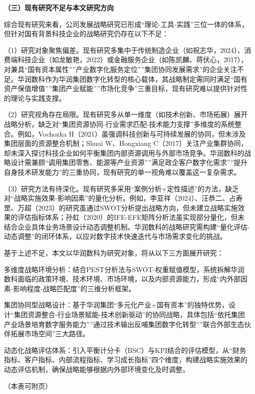\documentclass[UTF8, a4paper, 11pt]{ctexart}
\begin{document}
\begin{UnifiedBox}
\vspace{0.3cm}
\noindent \textbf{（三）现有研究不足与本文研究方向}

\vspace{0.2cm}
综合现有研究来看，公司发展战略研究已形成``理论-工具-实践''三位一体的体系，但针对国有背景科技企业的战略研究仍存在以下不足：

（1）研究对象聚焦偏差。现有研究多集中于传统制造企业（如祝志华，2024）、消费端科技企业（如龙敏艳，2022）或金融服务企业（如陈凯麟、蒋伏心，2017），对兼具``国有资本属性''''产业数字化服务定位''''集团协同发展需求''的企业关注不足。华润数科作为华润集团数字化转型的核心载体，其战略制定需同时满足``国有资产保值增值''''集团产业赋能''''市场化竞争''三重目标，现有研究难以提供针对性的理论与实践支撑。

（2）研究视角存在局限。现有研究多从单一维度（如技术创新、市场拓展）展开战略分析，缺乏对``集团资源协同-行业需求匹配-技术能力支撑''多维度的系统整合。例如，Vochozka H（2021）虽强调科技创新与可持续发展的协同，但未涉及集团层面的资源整合机制；Shuai W、Hongxiang C（2017）关注产业集群协同，却未深入探讨科技企业如何平衡集团内部资源调用与外部市场竞争。华润数科的战略设计需兼顾``调用集团零售、能源等产业资源''''满足政企客户数字化需求''''提升自身技术研发能力''的三重协同，现有研究的单一视角难以覆盖这一复杂需求。

（3）研究方法有待深化。现有研究多采用``案例分析+定性描述''的方法，缺乏对``战略实施效果-影响因素''的量化分析。例如，李亚祥（2024）、汪恭二、占寿罡、万超（2023）的研究虽通过SWOT分析提出战略方向，但未建立战略实施效果的评估指标体系；孙虹（2020）的IFE-EFE矩阵分析法虽实现部分量化，但未结合企业具体业务场景设计动态调整机制。华润数科的战略研究需构建``量化评估-动态调整''的闭环体系，以应对数字技术快速迭代与市场需求变化的挑战。

基于上述不足，本文以华润数科为研究对象，将从以下三方面展开研究：

多维度战略环境分析：结合PEST分析法与SWOT-权重赋值模型，系统拆解华润数科面临的政策环境、技术环境、市场环境，以及内部资源能力，形成``内外部因素-影响程度-战略匹配度''的三维分析框架。

集团协同型战略设计：基于华润集团``多元化产业+国有资本''的独特优势，设计``集团资源整合-行业场景赋能-技术创新驱动''的协同战略，具体包括``依托集团产业场景培育数字服务能力''''通过技术输出反哺集团数字化转型''''联合外部生态伙伴拓展市场空间''三大路径。

动态化战略评估体系：引入平衡计分卡（BSC）与KPI结合的评估模型，从``财务指标、客户指标、内部流程指标、学习成长指标''四个维度，构建战略实施效果的动态评估机制，确保战略能够根据内外部环境变化及时调整。

\vfill
\begin{flushright} （本表可附页） \end{flushright}
\end{UnifiedBox}
\end{document}
